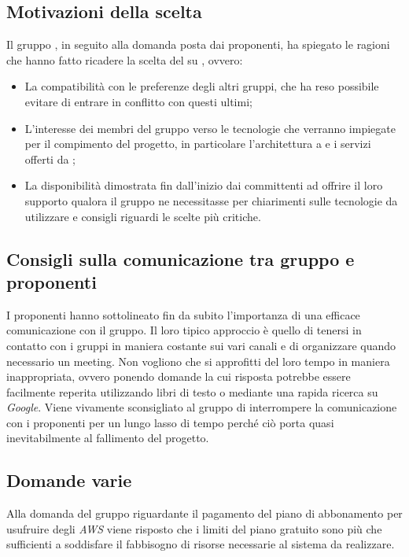 \subsection{Motivazioni della scelta}
Il gruppo {\Gruppo}, in seguito alla domanda posta dai proponenti, ha spiegato le ragioni che hanno fatto ricadere la scelta del  su {\NomeProgetto}, ovvero:
\begin{itemize}
	\item La compatibilità con le preferenze degli altri gruppi, che ha reso possibile evitare di entrare in conflitto con questi ultimi;
	\item L'interesse dei membri del gruppo verso le tecnologie che verranno impiegate per il compimento del progetto, in particolare l'architettura a  e i servizi offerti da ;
	\item La disponibilità dimostrata fin dall'inizio dai committenti ad offrire il loro supporto qualora il gruppo ne necessitasse per chiarimenti sulle tecnologie da utilizzare e consigli riguardi le scelte più critiche.
\end{itemize}

\subsection{Consigli sulla comunicazione tra gruppo e proponenti}
I proponenti hanno sottolineato fin da subito l'importanza di una efficace comunicazione con il gruppo. Il loro tipico approccio è quello di tenersi in contatto con i gruppi in maniera costante sui vari canali  e di organizzare quando necessario un meeting.
Non vogliono che si approfitti del loro tempo in maniera inappropriata, ovvero ponendo domande la cui risposta potrebbe essere facilmente reperita utilizzando libri di testo o mediante una rapida ricerca su \textit{Google}.
Viene vivamente sconsigliato al gruppo di interrompere la comunicazione con i proponenti per un lungo lasso di tempo perché ciò porta quasi inevitabilmente al fallimento del progetto.

\subsection{Domande varie}
Alla domanda del gruppo riguardante il pagamento del piano di abbonamento per usufruire degli \textit{AWS} viene risposto che i limiti del piano gratuito sono più che sufficienti a soddisfare il fabbisogno di risorse necessarie al sistema da realizzare.

